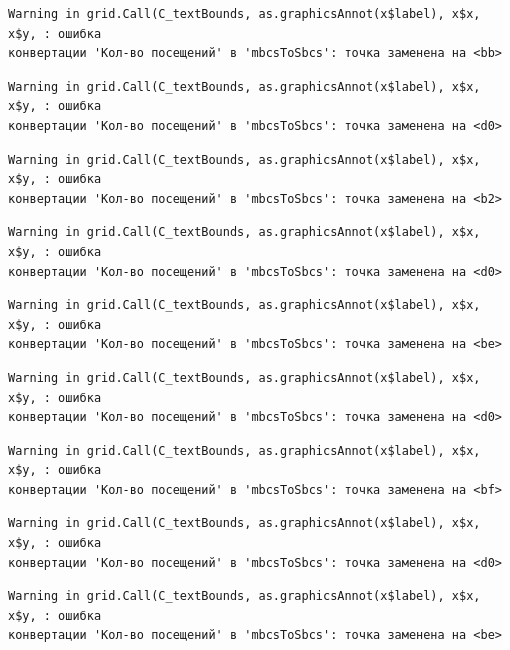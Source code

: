 \documentclass[
  letterpaper,
  DIV=11,
  numbers=noendperiod]{scrreprt}
\begin{document}
\begin{verbatim}
Warning in grid.Call(C_textBounds, as.graphicsAnnot(x$label), x$x, x$y, : ошибка
конвертации 'Кол-во посещений' в 'mbcsToSbcs': точка заменена на <bb>
\end{verbatim}

\begin{verbatim}
Warning in grid.Call(C_textBounds, as.graphicsAnnot(x$label), x$x, x$y, : ошибка
конвертации 'Кол-во посещений' в 'mbcsToSbcs': точка заменена на <d0>
\end{verbatim}

\begin{verbatim}
Warning in grid.Call(C_textBounds, as.graphicsAnnot(x$label), x$x, x$y, : ошибка
конвертации 'Кол-во посещений' в 'mbcsToSbcs': точка заменена на <b2>
\end{verbatim}

\begin{verbatim}
Warning in grid.Call(C_textBounds, as.graphicsAnnot(x$label), x$x, x$y, : ошибка
конвертации 'Кол-во посещений' в 'mbcsToSbcs': точка заменена на <d0>
\end{verbatim}

\begin{verbatim}
Warning in grid.Call(C_textBounds, as.graphicsAnnot(x$label), x$x, x$y, : ошибка
конвертации 'Кол-во посещений' в 'mbcsToSbcs': точка заменена на <be>
\end{verbatim}

\begin{verbatim}
Warning in grid.Call(C_textBounds, as.graphicsAnnot(x$label), x$x, x$y, : ошибка
конвертации 'Кол-во посещений' в 'mbcsToSbcs': точка заменена на <d0>
\end{verbatim}

\begin{verbatim}
Warning in grid.Call(C_textBounds, as.graphicsAnnot(x$label), x$x, x$y, : ошибка
конвертации 'Кол-во посещений' в 'mbcsToSbcs': точка заменена на <bf>
\end{verbatim}

\begin{verbatim}
Warning in grid.Call(C_textBounds, as.graphicsAnnot(x$label), x$x, x$y, : ошибка
конвертации 'Кол-во посещений' в 'mbcsToSbcs': точка заменена на <d0>
\end{verbatim}

\begin{verbatim}
Warning in grid.Call(C_textBounds, as.graphicsAnnot(x$label), x$x, x$y, : ошибка
конвертации 'Кол-во посещений' в 'mbcsToSbcs': точка заменена на <be>
\end{verbatim}
\end{document}
